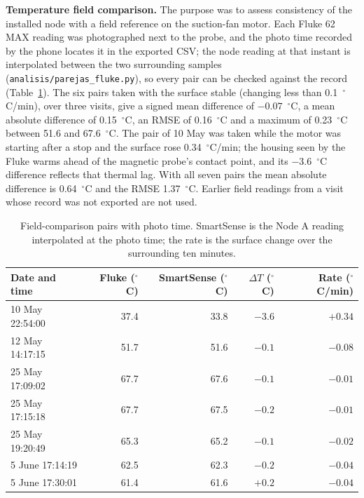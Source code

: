 \documentclass[11pt, letterpaper]{article}
\begin{document}
\textbf{Temperature field comparison.} The purpose was to assess consistency of the installed node with a field reference on the suction-fan motor. Each Fluke 62 MAX reading was photographed next to the probe, and the photo time recorded by the phone locates it in the exported CSV; the node reading at that instant is interpolated between the two surrounding samples (\texttt{analisis/parejas\_fluke.py}), so every pair can be checked against the record (Table~\ref{tab:thermal-pairs}). The six pairs taken with the surface stable (changing less than 0.1~$^{\circ}$C/min), over three visits, give a signed mean difference of $-0.07$~$^{\circ}$C, a mean absolute difference of 0.15~$^{\circ}$C, an RMSE of 0.16~$^{\circ}$C and a maximum of 0.23~$^{\circ}$C between 51.6 and 67.6~$^{\circ}$C. The pair of 10 May was taken while the motor was starting after a stop and the surface rose 0.34~$^{\circ}$C/min; the housing seen by the Fluke warms ahead of the magnetic probe's contact point, and its $-3.6$~$^{\circ}$C difference reflects that thermal lag. With all seven pairs the mean absolute difference is 0.64~$^{\circ}$C and the RMSE 1.37~$^{\circ}$C. Earlier field readings from a visit whose record was not exported are not used.

\begin{table}[h]
\centering
\begin{tabular}{lrrrr}
\hline
Date and time & Fluke ($^{\circ}$C) & SmartSense ($^{\circ}$C) & $\Delta T$ ($^{\circ}$C) & Rate ($^{\circ}$C/min) \\
\hline
10 May 22:54:00 & 37.4 & 33.8 & $-3.6$ & $+0.34$ \\
12 May 14:17:15 & 51.7 & 51.6 & $-0.1$ & $-0.08$ \\
25 May 17:09:02 & 67.7 & 67.6 & $-0.1$ & $-0.01$ \\
25 May 17:15:18 & 67.7 & 67.5 & $-0.2$ & $-0.01$ \\
25 May 19:20:49 & 65.3 & 65.2 & $-0.1$ & $-0.02$ \\
5 June 17:14:19 & 62.5 & 62.3 & $-0.2$ & $-0.04$ \\
5 June 17:30:01 & 61.4 & 61.6 & $+0.2$ & $-0.04$ \\
\hline
\end{tabular}
\caption{Field-comparison pairs with photo time. SmartSense is the Node A reading interpolated at the photo time; the rate is the surface change over the surrounding ten minutes.}
\label{tab:thermal-pairs}
\end{table}
\end{document}
